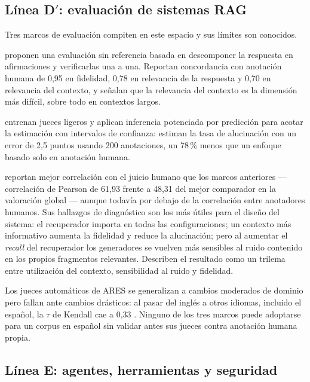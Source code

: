 \subsection{Línea D$'$: evaluación de sistemas RAG}
\label{sec:arte-dprima}

Tres marcos de evaluación compiten en este espacio y sus límites son conocidos.

\textcite{es2024ragas} proponen una evaluación sin referencia basada en descomponer la
respuesta en afirmaciones y verificarlas una a una. Reportan concordancia con
anotación humana de 0,95 en fidelidad, 0,78 en relevancia de la respuesta y 0,70 en
relevancia del contexto, y señalan que la relevancia del contexto es la dimensión más
difícil, sobre todo en contextos largos.

\textcite{saadfalcon2024ares} entrenan jueces ligeros y aplican inferencia
potenciada por predicción para acotar la estimación con intervalos de confianza:
estiman la tasa de alucinación con un error de 2,5 puntos usando 200 anotaciones, un
78\,\% menos que un enfoque basado solo en anotación humana.

\textcite{ru2024ragchecker} reportan mejor correlación con el juicio humano que los
marcos anteriores --- correlación de Pearson de 61,93 frente a 48,31 del mejor
comparador en la valoración global --- aunque todavía por debajo de la correlación
entre anotadores humanos. Sus hallazgos de diagnóstico son los más útiles para el
diseño del sistema: el recuperador importa en todas las configuraciones; un contexto
más informativo aumenta la fidelidad y reduce la alucinación; pero al aumentar el
\emph{recall} del recuperador los generadores se vuelven más sensibles al ruido
contenido en los propios fragmentos relevantes. Describen el resultado como un
trilema entre utilización del contexto, sensibilidad al ruido y fidelidad.

\begin{advertencia}
Los jueces automáticos de ARES se generalizan a cambios moderados de dominio pero
fallan ante cambios drásticos: al pasar del inglés a otros idiomas, incluido el
español, la $\tau$ de Kendall cae a 0,33 \parencite[p.~8]{saadfalcon2024ares}. Ninguno
de los tres marcos puede adoptarse para un corpus en español sin validar antes sus
jueces contra anotación humana propia.
\end{advertencia}

\subsection{Línea E: agentes, herramientas y seguridad}
\label{sec:arte-e}

